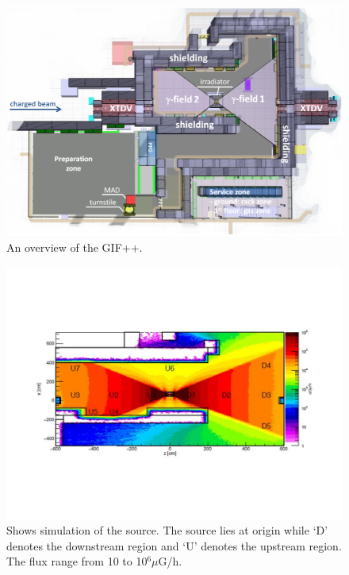 \documentclass[a4paper,11pt]{article}
\begin{document}
\begin{figure}[htp]
\centering
\hspace{-0.5cm}
\includegraphics[scale=0.35]{images/GIF.png}
 \caption{An overview of the GIF++.}
\label{gif}
\end{figure}

\begin{figure}[htp]
\centering
\hspace{-0.5cm}
\includegraphics[scale=0.5,trim=60 130 60 130,clip]{images/simulation.jpg}
 \caption{Shows simulation of the source. The source lies at origin while `D' denotes the downstream region and `U' denotes the upstream region. The flux range from 10 to 10$^{6} \mu$G/h. }
\label{source}
\end{figure}
\end{document}
